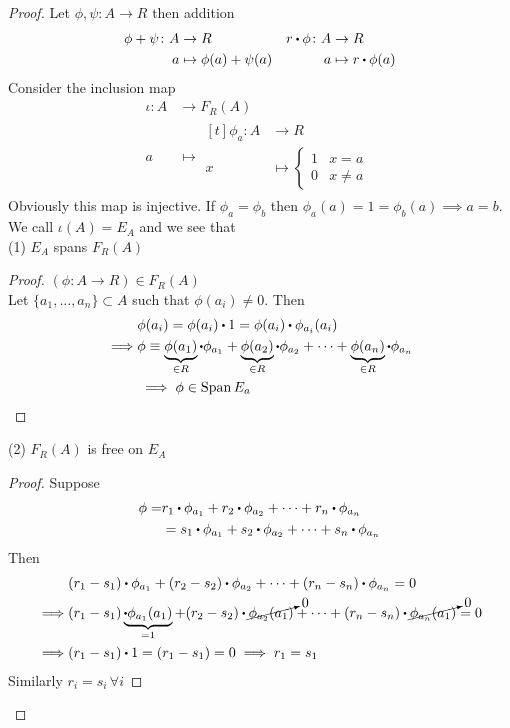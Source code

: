 \documentclass[../Main.tex]{subfiles}
\begin{document}
\begin{proof}
	Let $\phi,\psi\colon A\to R$ then addition
	\begin{align*}
		\phi+\psi\colon A&\to R &   r\rdot \phi \colon A&\to R\\
		a&\mapsto \phi(a)+\psi(a)& a&\mapsto r\rdot \phi(a)
	\end{align*}
	Consider the inclusion map
	\begin{align*}
	\iota\colon A &\to F_R(A)\\
	a&\mapsto 
	\begin{aligned}[t]
	\phi_a\colon A&\to R\\
	x&\mapsto \begin{cases}
	1&x=a\\
	0&x\ne a
	\end{cases}
	\end{aligned}
	\end{align*}
	Obviously this map is injective. If $\phi_a=\phi_b$ then $\phi_a(a)=1=\phi_b(a)\implies a=b$.\\
	We call $\iota(A)=E_A$ and we see that\\
	(1) $E_A$ spans $F_R(A)$
	\begin{proof}
		$(\phi\colon A\to R)\in F_R(A)$\\
		Let $\{a_1,\dots,a_n\}\subset A$ such that $\phi(a_i)\ne 0$. Then
		\begin{align*}
		&\phi(a_i)=\phi(a_i)\rdot 1 = \phi(a_i)\rdot \phi_{a_i}(a_i)\\
		\implies & \phi \equiv \underbrace{\phi(a_1)}_{\in R}\rdot \phi_{a_1} +\underbrace{\phi(a_2)}_{\in R}\rdot \phi_{a_2}+\dots+\underbrace{\phi(a_n)}_{\in R}\rdot \phi_{a_n}\\
		&\implies \phi \in \Span E_a \qedhere
		\end{align*}
	\end{proof}
	(2) $F_R(A)$ is free on $E_A$
	\begin{proof}
		Suppose
		\begin{align*}
		\phi=& r_1\rdot \phi_{a_1}+r_2\rdot \phi_{a_2}+\dots+r_n\rdot \phi_{a_n}\\
		&=s_1\rdot \phi_{a_1}+s_2\rdot \phi_{a_2}+\dots+s_n\rdot \phi_{a_n}
		\end{align*}
		Then
		\begin{align*}
		&(r_1-s_1)\rdot \phi_{a_1}+(r_2-s_2)\rdot \phi_{a_2}+\dots+(r_n-s_n)\rdot \phi_{a_n}=0\\
		\implies & (r_1-s_1)\underbrace{\rdot \phi_{a_1}(a_1)}_{=1}+(r_2-s_2)\rdot \cancelto{0}{\phi_{a_2}(a_1)}+\dots+(r_n-s_n)\rdot \cancelto{0}{\phi_{a_n}(a_1)}=0\\
		\implies & (r_1-s_1)\rdot 1=(r_1-s_1)=0\implies r_1=s_1
		\end{align*}
		Similarly $r_i=s_i\,\forall i$
	\end{proof}
\end{proof}
\end{document}
